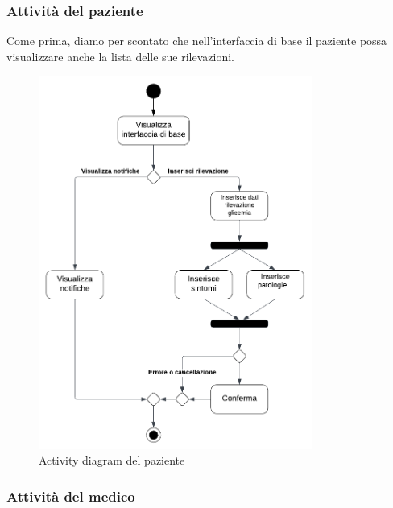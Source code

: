 \documentclass[a4paper]{article}
\begin{document}
\subsubsection{Attività del paziente}
Come prima, diamo per scontato che nell'interfaccia di base il paziente 
possa visualizzare anche la lista delle sue rilevazioni.

\begin{figure}[H]
  \begin{center}
    \includegraphics[width=0.8\textwidth]{adPaziente}
  \end{center}
  \caption{Activity diagram del paziente}
  \label{fig:adPaziente}
\end{figure}

\subsubsection{Attività del medico}
\end{document}
